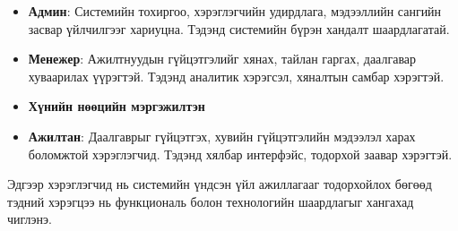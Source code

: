 
\begin{itemize}
    \item \textbf{Админ}: Системийн тохиргоо, хэрэглэгчийн удирдлага, мэдээллийн сангийн засвар үйлчилгээг хариуцна. Тэдэнд системийн бүрэн хандалт шаардлагатай.
    \item \textbf{Менежер}: Ажилтнуудын гүйцэтгэлийг хянах, тайлан гаргах, даалгавар хуваарилах үүрэгтэй. Тэдэнд аналитик хэрэгсэл, хяналтын самбар хэрэгтэй.
    \item \textbf{Хүнийн нөөцийн мэргэжилтэн}
    \item \textbf{Ажилтан}: Даалгаврыг гүйцэтгэх, хувийн гүйцэтгэлийн мэдээлэл харах боломжтой хэрэглэгчид. Тэдэнд хялбар интерфэйс, тодорхой заавар хэрэгтэй.
\end{itemize}
Эдгээр хэрэглэгчид нь системийн үндсэн үйл ажиллагааг тодорхойлох бөгөөд тэдний хэрэгцээ нь функциональ болон технологийн шаардлагыг хангахад чиглэнэ.